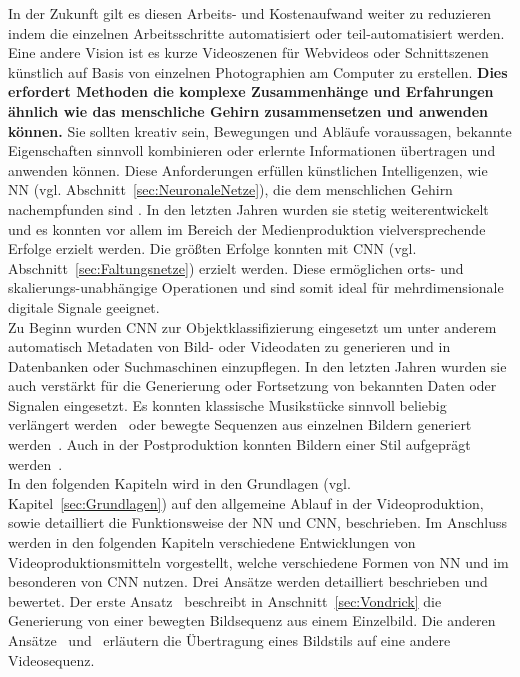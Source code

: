 \documentclass[times, 11pt,twocolumn]{article}
\begin{document}
In der Zukunft gilt es diesen Arbeits- und Kostenaufwand weiter zu reduzieren indem die einzelnen Arbeitsschritte automatisiert oder teil-automatisiert werden. Eine andere Vision ist es kurze Videoszenen für Webvideos oder Schnittszenen künstlich auf Basis von einzelnen Photographien am Computer zu erstellen. \textbf{Dies erfordert Methoden die komplexe Zusammenhänge und Erfahrungen ähnlich wie das menschliche Gehirn zusammensetzen und anwenden können.} Sie sollten kreativ sein, Bewegungen und Abläufe voraussagen, bekannte Eigenschaften sinnvoll kombinieren oder erlernte Informationen übertragen und anwenden können. Diese Anforderungen erfüllen künstlichen Intelligenzen, wie NN (vgl. Abschnitt~\ref{sec:NeuronaleNetze}), die dem menschlichen Gehirn nachempfunden sind \cite{McCaigDG16}. In den letzten Jahren wurden sie stetig weiterentwickelt und es konnten vor allem im Bereich der Medienproduktion vielversprechende Erfolge erzielt werden. Die größten Erfolge konnten mit CNN (vgl. Abschnitt~\ref{sec:Faltungsnetze}) erzielt werden. Diese  ermöglichen orts- und skalierungs-unabhängige Operationen und sind somit ideal für mehrdimensionale digitale Signale geeignet.\\

Zu Beginn wurden CNN zur Objektklassifizierung eingesetzt um unter anderem automatisch Metadaten von Bild- oder Videodaten zu generieren und in Datenbanken oder Suchmaschinen einzupflegen. In den letzten Jahren wurden sie auch verstärkt für die Generierung oder Fortsetzung von bekannten Daten oder Signalen eingesetzt. Es konnten klassische Musikstücke sinnvoll beliebig verlängert werden~\cite{OordDZSVGKSK16} oder bewegte Sequenzen aus einzelnen Bildern generiert werden~\cite{VondrickPT16}. Auch in der Postproduktion konnten Bildern einer Stil aufgeprägt werden~\cite{DeepDream}. \\

In den folgenden Kapiteln wird in den Grundlagen (vgl. Kapitel~\ref{sec:Grundlagen}) auf den allgemeine Ablauf in der Videoproduktion, sowie detailliert die Funktionsweise der NN und CNN, beschrieben. Im Anschluss werden in den folgenden Kapiteln verschiedene Entwicklungen von Videoproduktionsmitteln vorgestellt, welche verschiedene Formen von NN und im besonderen von CNN nutzen. Drei Ansätze werden detailliert beschrieben und bewertet. Der erste Ansatz~\cite{VondrickPT16} beschreibt in Anschnitt~\ref{sec:Vondrick} die Generierung von einer bewegten Bildsequenz aus einem Einzelbild. Die anderen Ansätze~ \cite{DeepDream} und~\cite{GatysEB15a} erläutern die Übertragung eines Bildstils auf eine andere Videosequenz.
\end{document}
